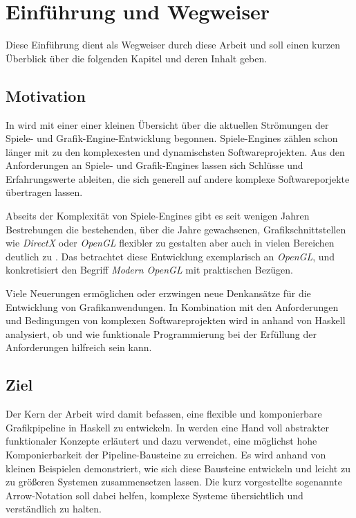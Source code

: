 \chapter{Einführung und Wegweiser}

Diese Einführung dient als Wegweiser durch diese Arbeit und soll einen kurzen Überblick über die folgenden Kapitel und deren Inhalt geben.

\section{Motivation}
In  wird mit einer einer kleinen Übersicht über die aktuellen Strömungen der Spiele- und Grafik-Engine-Entwicklung begonnen. Spiele-Engines zählen schon länger mit zu den komplexesten und dynamischsten Softwareprojekten. Aus den Anforderungen an Spiele- und Grafik-Engines lassen sich Schlüsse und Erfahrungswerte ableiten, die sich generell auf andere komplexe Softwareporjekte übertragen lassen.

Abseits der Komplexität von Spiele-Engines gibt es seit wenigen Jahren Bestrebungen die bestehenden, über die Jahre gewachsenen, Grafikschnittstellen wie \textit{DirectX} oder \textit{OpenGL} flexibler zu gestalten aber auch in vielen Bereichen deutlich zu . Das  betrachtet diese Entwicklung exemplarisch an \textit{OpenGL}, und konkretisiert den Begriff \textit{Modern OpenGL} mit praktischen Bezügen.

Viele Neuerungen ermöglichen oder erzwingen neue Denkansätze für die Entwicklung von Grafikanwendungen. In Kombination mit den Anforderungen und Bedingungen von komplexen Softwareprojekten wird in  anhand von Haskell analysiert, ob und wie funktionale Programmierung bei der Erfüllung der Anforderungen hilfreich sein kann.

\section{Ziel}
Der Kern der Arbeit wird damit befassen, eine flexible und komponierbare Grafikpipeline in Haskell zu entwickeln. In  werden eine Hand voll abstrakter funktionaler Konzepte erläutert und dazu verwendet, eine möglichst hohe Komponierbarkeit der Pipeline-Bausteine zu erreichen. Es wird anhand von kleinen Beispielen demonstriert, wie sich diese Bausteine entwickeln und leicht zu zu größeren Systemen zusammensetzen lassen. Die kurz vorgestellte sogenannte Arrow-Notation soll dabei helfen, komplexe Systeme übersichtlich und verständlich zu halten.

